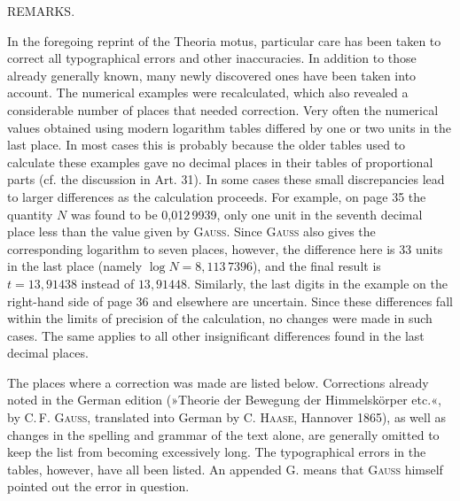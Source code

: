\clearpage
{}
\begin{center}\large REMARKS.\end{center}
In the foregoing reprint of the Theoria motus, particular care has been taken to correct
all typographical errors and other inaccuracies. In addition to those already generally
known, many newly discovered ones have been taken into account. The numerical examples
were recalculated, which also revealed a considerable number of places that needed
correction. Very often the numerical values obtained using modern logarithm tables
differed by one or two units in the last place. In most cases this is probably because
the older tables used to calculate these examples gave no decimal places in their
tables of proportional parts (cf. the discussion in Art. 31). In some cases these small
discrepancies lead to larger differences as the calculation proceeds. For example, on
page 35 the quantity $N$ was found to be 0,012\,9939, only one unit in the seventh
decimal place less than the value given by \textsc{Gauss}. Since \textsc{Gauss} also
gives the corresponding logarithm to seven places, however, the difference here is
33 units in the last place (namely $\log N = 8{,}113\,7396$), and the final result is
$t = 13{,}91438$ instead of $13{,}91448$. Similarly, the last digits in the example on
the right-hand side of page 36 and elsewhere are uncertain. Since these differences
fall within the limits of precision of the calculation, no changes were made in such
cases. The same applies to all other insignificant differences found in the last
decimal places.

The places where a correction was made are listed below. Corrections already noted in
the German edition (»Theorie der Bewegung der Himmelskörper etc.«, by C.\,F.
\textsc{Gauss}, translated into German by C. \textsc{Haase}, Hannover 1865), as well as
changes in the spelling and grammar of the text alone, are generally omitted to keep
the list from becoming excessively long. The typographical errors in the tables,
however, have all been listed. An appended G. means that \textsc{Gauss} himself pointed
out the error in question.


